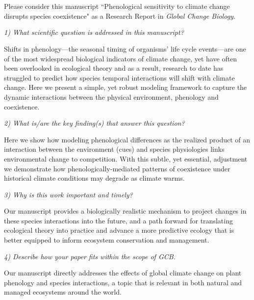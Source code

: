 \documentclass{article}[12pt]
\begin{document}

\def\labelitemi{--}
\parindent=24pt
 
\\\\

\noindent Please consider this manuscript ``Phenological sensitivity to climate change disrupts species coexistence" as a Research Report in \emph{Global Change Biology}.

\noindent\emph{1) What scientific question is addressed in this manuscript?}

\noindent Shifts in phenology---the seasonal timing of organisms' life cycle events---are one of the most widespread biological indicators of climate change, yet have often been overlooked in ecological theory and as a result, research to date has struggled to predict how species temporal interactions will shift with climate change. Here we present a simple, yet robust modeling framework to capture the dynamic interactions between the physical environment, phenology and coexistence.

\noindent\emph{2) What is/are the key finding(s) that answer this question?}

\noindent Here we show how modeling phenological differences as the realized product of an interaction between the environment (cues) and species physiologies links environmental change to competition. With this subtle, yet essential, adjustment we demonstrate how phenologically-mediated patterns of coexistence under historical climate conditions may degrade as climate warms.

\noindent \emph{3) Why is this work important and timely?}

\noindent Our manuscript provides a biologically realistic mechanism to project changes in these species interactions into the future, and a path forward for translating ecological theory into practice and advance a more predictive ecology that is better equipped to inform ecosystem conservation and management.
 
\noindent \emph{4) Describe how your paper fits within the scope of GCB.}

\noindent Our manuscript directly addresses the effects of global climate change on plant phenology and species interactions, a topic that is relevant in both natural and managed ecosystems around the world. 
\end{document}
